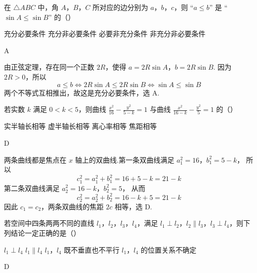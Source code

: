 \begin{problem}
在 \(\triangle ABC\) 中，角 \(A\)，\(B\)，\(C\) 所对应的边分别为 \(a\)，\(b\)，\(c\)，则 “\(a \leqslant b\)” 是 “\(\sin A \leqslant \sin B\)” 的（\quad）

\choices
    {充分必要条件}
    {充分非必要条件}
    {必要非充分条件}
    {非充分非必要条件}
\end{problem}

\begin{answer}
A
\end{answer}

\begin{solution}
由正弦定理，存在同一个正数 \(2R\)，使得
\(a=2R\sin A\)，\(b=2R\sin B\).
因为 \(2R>0\)，所以
\[
a\leqslant b\iff 2R\sin A\leqslant 2R\sin B
\iff \sin A\leqslant\sin B
\]
两个不等式互相推出，故这是充分必要条件，选 A.
\end{solution}

\begin{problem}
若实数 \(k\) 满足 \(0 < k < 5\)，则曲线 \(\frac{x^{2}}{16} - \frac{y^{2}}{5-k} = 1\) 与曲线 \(\frac{x^{2}}{16-k} - \frac{y^{2}}{5} = 1\) 的（\quad）

\choices
    {实半轴长相等}
    {虚半轴长相等}
    {离心率相等}
    {焦距相等}
\end{problem}

\begin{answer}
D
\end{answer}

\begin{solution}
两条曲线都是焦点在 \(x\) 轴上的双曲线.第一条双曲线满足
\(a_1^2=16\)，\(b_1^2=5-k\)，
所以
\[
c_1^2=a_1^2+b_1^2=16+5-k=21-k
\]
第二条双曲线满足
\(a_2^2=16-k\)，\(b_2^2=5\)，
从而
\[
c_2^2=a_2^2+b_2^2=16-k+5=21-k
\]
因此 \(c_1=c_2\)，两条双曲线的焦距 \(2c\) 相等，选 D.
\end{solution}

\begin{problem}
若空间中四条两两不同的直线 \(l_{1}\)，\(l_{2}\)，\(l_{3}\)，\(l_{4}\)，满足 \(l_{1} \perp l_{2}\)，\(l_{2} \parallel l_{3}\)，\(l_{3} \perp l_{4}\)，则下列结论一定正确的是（\quad）

\choices
    {\(l_{1} \perp l_{4}\)}
    {\(l_{1} \parallel l_{4}\)}
    {\(l_{1}\)，\(l_{4}\) 既不垂直也不平行}
    {\(l_{1}\)，\(l_{4}\) 的位置关系不确定}
\end{problem}

\begin{answer}
D
\end{answer}

